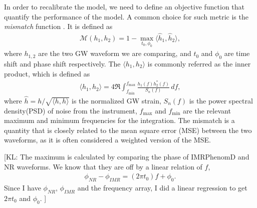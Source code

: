 \documentclass[twocolumn]{aastex631}
\newcommand{\kl}[1]{{\color{cyan}[KL: #1 ]}}
\begin{document}
In order to recalibrate the model, we need to define an objective function that
quantify the performance of the model. A common choice for such metric is the
\textit{mismatch} function \citep{husa2016frequency}. It is defined as
\begin{align} \label{eq:mismatch}
	\mathcal{M}(h_1, h_2)=1-\max_{t_0, \phi_0}\langle \hat{h}_1, \hat{h}_2\rangle,
\end{align}
where $h_{1,2}$ are the two GW waveform we are comparing, and $t_0$ and $\phi_0$
are time shift and phase shift respectively. The $\langle h_1, h_2 \rangle$ is
commonly referred as the inner product, which is defined as 
\begin{align}\label{eq:inner_prod}
	\langle h_1, h_2 \rangle = 4\Re\int_{f_{\mathrm{min}}}^{f_{\mathrm{max}}}\frac{h_1(f)h_2^{\ast}(f)}{S_n(f)}\,df,
\end{align}
where $\hat{h}=h/\sqrt{\langle h, h \rangle}$ is the normalized GW strain,
$S_n(f)$ is the power spectral density(PSD) of noise from the instrument, $f_{\mathrm{max}}$ and $f_{\mathrm{min}}$ are
the relevant maximum and minimum frequencies for the integration. The mismatch
is a quantity that is closely related to the mean square error (MSE) between the
two waveforms, as it is often considered a weighted version of the MSE. 

\kl{The maximum is calculated by comparing the phase of IMRPhenomD and NR waveforms. We know that they are off by a linear relation of $f$, 
\begin{align*}
	\phi_{NR}-\phi_{IMR}=(2\pi t_0)f+\phi_0.
\end{align*}
Since I have $\phi_{NR}$, $\phi_{IMR}$ and the frequency array, I did a linear regression to get $2\pi t_0$ and $\phi_0$.}
\end{document}
